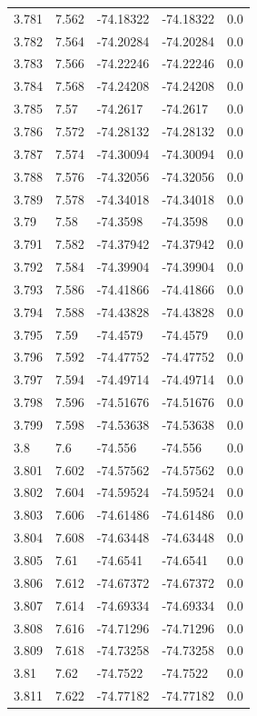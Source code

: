 \begin{tabular}{lllll}
3.781 & 7.562 & -74.18322 & -74.18322 & 0.0 \\
3.782 & 7.564 & -74.20284 & -74.20284 & 0.0 \\
3.783 & 7.566 & -74.22246 & -74.22246 & 0.0 \\
3.784 & 7.568 & -74.24208 & -74.24208 & 0.0 \\
3.785 & 7.57 & -74.2617 & -74.2617 & 0.0 \\
3.786 & 7.572 & -74.28132 & -74.28132 & 0.0 \\
3.787 & 7.574 & -74.30094 & -74.30094 & 0.0 \\
3.788 & 7.576 & -74.32056 & -74.32056 & 0.0 \\
3.789 & 7.578 & -74.34018 & -74.34018 & 0.0 \\
3.79 & 7.58 & -74.3598 & -74.3598 & 0.0 \\
3.791 & 7.582 & -74.37942 & -74.37942 & 0.0 \\
3.792 & 7.584 & -74.39904 & -74.39904 & 0.0 \\
3.793 & 7.586 & -74.41866 & -74.41866 & 0.0 \\
3.794 & 7.588 & -74.43828 & -74.43828 & 0.0 \\
3.795 & 7.59 & -74.4579 & -74.4579 & 0.0 \\
3.796 & 7.592 & -74.47752 & -74.47752 & 0.0 \\
3.797 & 7.594 & -74.49714 & -74.49714 & 0.0 \\
3.798 & 7.596 & -74.51676 & -74.51676 & 0.0 \\
3.799 & 7.598 & -74.53638 & -74.53638 & 0.0 \\
3.8 & 7.6 & -74.556 & -74.556 & 0.0 \\
3.801 & 7.602 & -74.57562 & -74.57562 & 0.0 \\
3.802 & 7.604 & -74.59524 & -74.59524 & 0.0 \\
3.803 & 7.606 & -74.61486 & -74.61486 & 0.0 \\
3.804 & 7.608 & -74.63448 & -74.63448 & 0.0 \\
3.805 & 7.61 & -74.6541 & -74.6541 & 0.0 \\
3.806 & 7.612 & -74.67372 & -74.67372 & 0.0 \\
3.807 & 7.614 & -74.69334 & -74.69334 & 0.0 \\
3.808 & 7.616 & -74.71296 & -74.71296 & 0.0 \\
3.809 & 7.618 & -74.73258 & -74.73258 & 0.0 \\
3.81 & 7.62 & -74.7522 & -74.7522 & 0.0 \\
3.811 & 7.622 & -74.77182 & -74.77182 & 0.0 \\

\end{tabular}
